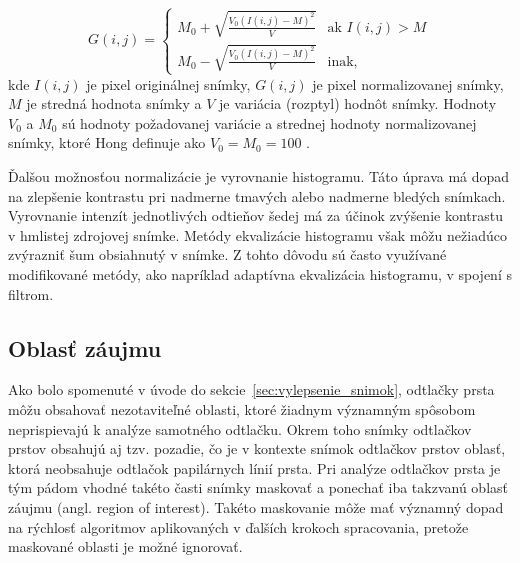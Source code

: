   \begin{equation}
    G(i,j) =
    \begin{cases}
      M_0 + \sqrt{\frac{V_0 (I(i,j)-M)^2}{V}}  & \text{ak } I(i,j) > M \\
      M_0 - \sqrt{\frac{V_0 (I(i,j)-M)^2}{V}} & \text{inak,}
    \end{cases}
    \label{eq:normalizacia_Hong}
  \end{equation}
  kde $I(i,j)$ je pixel originálnej snímky, $G(i,j)$ je pixel normalizovanej snímky, $M$ je stredná hodnota snímky a $V$ je variácia (rozptyl) hodnôt snímky.
  Hodnoty $V_0$ a $M_0$ sú hodnoty požadovanej variácie a strednej hodnoty normalizovanej snímky, ktoré Hong definuje ako $V_0 = M_0 = 100$ \cite{Hong}.

  Ďalšou možnosťou normalizácie je vyrovnanie histogramu. Táto úprava má dopad na zlepšenie kontrastu pri nadmerne tmavých
  alebo nadmerne bledých snímkach. Vyrovnanie intenzít jednotlivých odtieňov šedej má za účinok zvýšenie kontrastu v hmlistej zdrojovej snímke.
  Metódy ekvalizácie histogramu však môžu nežiadúco zvýrazniť šum obsiahnutý v snímke. Z tohto dôvodu sú často využívané modifikované metódy,
  ako napríklad adaptívna ekvalizácia histogramu, v spojení s filtrom.

  \subsection{Oblasť záujmu}
  Ako bolo spomenuté v úvode do sekcie~{\ref{sec:vylepsenie_snimok}}, odtlačky prsta môžu obsahovať nezotaviteľné oblasti, ktoré žiadnym významným spôsobom
  neprispievajú k analýze samotného odtlačku. Okrem toho snímky odtlačkov prstov obsahujú aj tzv. pozadie, čo je v kontexte snímok odtlačkov prstov oblasť,
  ktorá neobsahuje odtlačok papilárnych línií prsta. Pri analýze odtlačkov prsta je tým pádom vhodné takéto časti snímky maskovať a ponechať iba takzvanú
  oblasť záujmu (angl. region of interest). Takéto maskovanie môže mať významný dopad na rýchlosť algoritmov aplikovaných v ďalších krokoch spracovania,
  pretože maskované oblasti je možné ignorovať.

